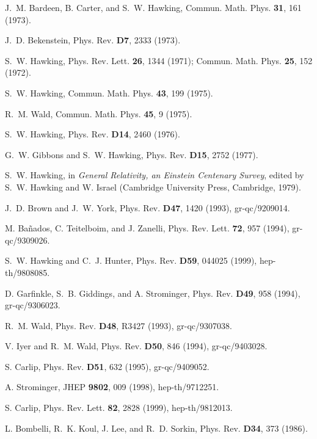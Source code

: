 \begin{thebibliography}{10}

J.~M. Bardeen, B. Carter, and S.~W. Hawking, Commun. Math. Phys. {\bf 31},  161
   (1973).

J.~D. Bekenstein, Phys. Rev. {\bf D7},  2333  (1973).

S.~W. Hawking, Phys. Rev. Lett. {\bf 26},  1344  (1971);
Commun. Math. Phys. {\bf 25},  152  (1972).

S.~W. Hawking, Commun. Math. Phys. {\bf 43},  199  (1975).

R.~M. Wald, Commun. Math. Phys. {\bf 45},  9  (1975).

S.~W. Hawking, Phys. Rev. {\bf D14},  2460  (1976).

G.~W. Gibbons and S.~W. Hawking, Phys. Rev. {\bf D15},  2752  (1977).

S.~W. Hawking,  in {\em General Relativity, an {E}instein Centenary Survey},
  edited by S.~W. Hawking and W. Israel (Cambridge University Press, Cambridge,
  1979).

J.~D. Brown and J.~W. York, Phys. Rev. {\bf D47},  1420  (1993), gr-qc/9209014.

M. Ba{\~n}ados, C. Teitelboim, and J. Zanelli, Phys. Rev. Lett. {\bf 72},  957
  (1994), gr-qc/9309026.

S.~W. Hawking and C.~J. Hunter, Phys. Rev. {\bf D59},  044025  (1999),
  hep-th/9808085.

D. Garfinkle, S.~B. Giddings, and A. Strominger, Phys. Rev. {\bf D49},  958
  (1994), gr-qc/9306023.

R.~M. Wald, Phys. Rev. {\bf D48},  R3427  (1993), gr-qc/9307038.

V. Iyer and R.~M. Wald, Phys. Rev. {\bf D50},  846  (1994), gr-qc/9403028.

S. Carlip, Phys. Rev. {\bf D51},  632  (1995), gr-qc/9409052.

A. Strominger, JHEP {\bf 9802},  009  (1998), hep-th/9712251.

S. Carlip, Phys. Rev. Lett. {\bf 82},  2828  (1999), hep-th/9812013.

L. Bombelli, R.~K. Koul, J. Lee, and R.~D. Sorkin, Phys. Rev. {\bf D34},  373
  (1986).


\end{thebibliography}

